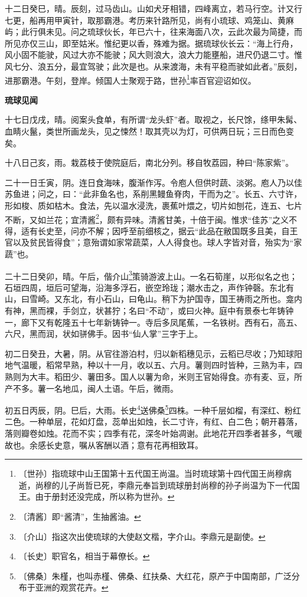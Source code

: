 \documentclass[12pt,UTF-8,openany]{ctexbook}
\begin{document}
\begin{normalsize}
    十二日癸巳，晴。辰刻，过马齿山。山如犬牙相错，四峰离立，若马行空。计又行七更，船再用甲寅针，取那霸港。考历来针路所见，尚有小琉球、鸡笼山、黄麻屿；此行俱未见。问之琉球伙长，年已六十，往来海面八次，云此次最为简捷，而所见亦仅三山，即至姑米。惟纪更以香，殊难为据。据琉球伙长云：“海上行舟，风小固不能驶，风过大亦不能驶；风大则浪大，浪大力能壅船，进尺仍退二寸。惟风七分、浪五分，最宜驾驶；此次是也。从来渡海，未有平稳而驶如此者。”辰刻，进那霸港。午刻，登岸。倾国人士聚观于路，世孙\footnote{〔世孙〕指琉球中山王国第十五代国王尚温。当时琉球第十四代国王尚穆病逝，尚穆的儿子尚哲已死，李鼎元奉旨到琉球册封尚穆的孙子尚温为下一代国王。由于册封还没完成，所以称为世孙。}率百官迎诏如仪。
    
    \begin{center}
        \textbf{琉球见闻}
    \end{center}
    
    十七日戊戌，晴。阅案头食单，有所谓“龙头虾”者。取视之，长尺馀，绦甲朱髯、血睛火鬣，类世所画龙头，见之悚然！取其壳以为灯，可供两日玩；三日而色变矣。
    
    十八日己亥，雨。栽荔枝于使院庭后，南北分列。移自牧荔园，种曰“陈家紫”。
    
    二十一日壬寅，阴。连日食海味，腹渐作泻。令庖人但供时蔬、淡粥。庖人乃以佳苏鱼进；问之，曰：“此非鱼名也，系削黑鳗鱼脊肉，干而为之”。长五、六寸许，形如梭、质如枯木。食法，先以温水浸洗，裹蕉叶煨之，切片如刨花，连五、七片不断，又如兰花；宜清酱\footnote{〔清酱〕即“酱清”，生抽酱油。}，颇有异味。清酱甘美，十倍于闽。惟求“佳苏”之义不得，适有长史至，问亦不解；因呼至前细核之，据云“此品在敝国既多且美，自王官以及贫民皆得食”；意殆谓如家常蔬菜，人人得食也。球人字皆对音，殆实为“家蔬”也。
    
    二十二日癸卯，晴。午后，偕介山\footnote{〔介山〕指这次出使琉球的大使赵文楷，字介山。李鼎元是副使。}策骑游波上山。一名石筍崖，以形似名之也；石垣四周，垣后可望海，沿海多浮石，嵌空玲珑；潮水击之，声作钟磬。东北有山，曰雪崎。又东北，有小石山，曰龟山。稍下为护国寺，国王祷雨之所也。龛内有神，黑而裸，手剑立，状甚狞；名曰“不动”，或曰火神。庭中有景泰七年铸钟一，廊下又有乾隆五十七年新铸钟一。寺后多凤尾蕉，一名铁树。西有石，高五、六尺，黑而润，状如骈佛手。因书“仙人掌”三字于上。
    
    初二日癸丑，大暑，阴。从官往游泊村，归以新稻穗见示，云稻已尽收；乃知球阳地气温暖，稻常早熟，种以十一月，收以五、六月。薯则四时皆种，三熟为丰，四熟则为大丰。稻田少、薯田多。国人以薯为命，米则王官始得食。亦有麦、豆，所产不多。薯一名地瓜，闽人土语。午后，微雨。
    
    初五日丙辰，阴。巳后，大雨。长史\footnote{〔长史〕职官名，相当于幕僚长。}送佛桑\footnote{〔佛桑〕朱槿，也叫赤槿、佛桑、红扶桑、大红花，原产于中国南部，广泛分布于亚洲的观赏花卉。}四株。一种千层如榴，有深红、粉红二色。一种单层，花如灯盘，蕊单出如烛，长二寸许，有红、白二色；朝开暮落，落则瓣卷如烛。花而不实；四季有花，深冬叶始凋谢。此地花开四季者甚多，气暖故也。余感长史意，嘱从客酬以酒；意有花再相致耳。
    

\end{normalsize}
\end{document}
